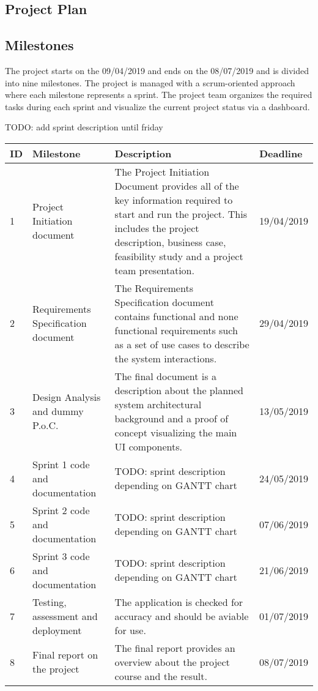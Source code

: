 \documentclass[notitlepage]{article}
\begin{document}
\begin{flushleft}
\section{Project Plan}

\subsection{Milestones}

The project starts on the 09/04/2019 and ends on the 08/07/2019 and is divided into nine milestones. The project is managed with a scrum-oriented approach
where each milestone represents a sprint. The project team organizes the required tasks during each sprint and visualize the current project status via a dashboard.

{\color{red} TODO: add sprint description until friday} \\
\begin{center}
  \begin{tabular}{ m{0.4cm} m{5cm} m{8.5cm} m{2cm} }
  	\hline
		ID & Milestone & Description & Deadline \\ \hline
		1 & Project Initiation document & The Project Initiation Document provides all of the key information required to start and run the project. This includes the project description, business case, feasibility study and a project team presentation.  & 19/04/2019 \\ \hline
		2 & Requirements Specification document & The Requirements Specification document contains functional and none functional requirements such as a set of use cases to describe the system interactions. & 29/04/2019 \\ \hline
		3 & Design Analysis and dummy P.o.C. & The final document is a description about the planned system architectural background and a proof of concept visualizing the main UI components. & 13/05/2019 \\ \hline
		4 & Sprint 1 code and documentation & {\color{red} TODO: sprint description depending on GANTT chart}  & 24/05/2019 \\ \hline
		5 & Sprint 2 code and documentation & {\color{red} TODO: sprint description depending on GANTT chart} & 07/06/2019 \\ \hline
		6 & Sprint 3 code and documentation & {\color{red} TODO: sprint description depending on GANTT chart} & 21/06/2019 \\ \hline
		7 & Testing, assessment and deployment & The application is checked for accuracy and should be aviable for use. & 01/07/2019 \\ \hline
		8 & Final report on the project & The final report provides an overview about the project course and the result. & 08/07/2019 \\ \hline
	\end{tabular}
\end{center}


\end{flushleft}
\end{document}
